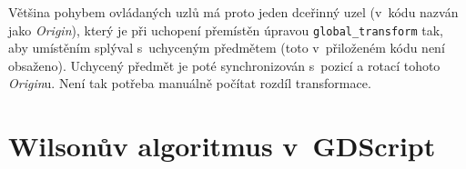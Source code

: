 \documentclass[12pt]{report}
\begin{document}
Většina pohybem ovládaných uzlů má proto jeden dceřinný uzel (v~kódu nazván jako \textit{Origin}), který je při uchopení přemístěn úpravou \texttt{global\_transform} tak, aby umístěním splýval s~uchyceným předmětem (toto v~přiloženém kódu není obsaženo). Uchycený předmět je poté synchronizován s~pozicí a rotací tohoto \textit{Origin}u. Není tak potřeba manuálně počítat rozdíl transformace.



\chapter{Wilsonův algoritmus v~GDScript}\label{apx_mazegen}

\end{document}
